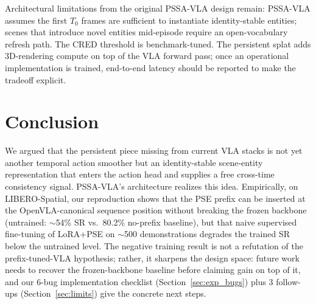 \documentclass[10pt,letterpaper]{article}
\newcommand{\method}{\textsc{PSSA-VLA}\xspace}
\begin{document}
\noindent
Architectural limitations from the original \method design remain:
\method assumes the first $T_0$ frames are sufficient to instantiate
identity-stable entities; scenes that introduce novel entities
mid-episode require an open-vocabulary refresh path. The CRED threshold
is benchmark-tuned. The persistent splat adds 3D-rendering compute on
top of the VLA forward pass; once an operational implementation is
trained, end-to-end latency should be reported to make the tradeoff
explicit.

\section{Conclusion}\label{sec:conclusion}

We argued that the persistent piece missing from current VLA stacks is
not yet another temporal action smoother but an identity-stable
scene-entity representation that enters the action head and supplies a
free cross-time consistency signal. \method's architecture realizes
this idea. Empirically, on LIBERO-Spatial, our reproduction shows that
the PSE prefix can be inserted at the OpenVLA-canonical sequence
position without breaking the frozen backbone (untrained: $\sim$54\%
SR vs.\ 80.2\% no-prefix baseline), but that naive supervised
fine-tuning of LoRA+PSE on $\sim$500 demonstrations degrades the
trained SR below the untrained level. The negative training result
is not a refutation of the prefix-tuned-VLA hypothesis; rather, it
sharpens the design space: future work needs to recover the
frozen-backbone baseline before claiming gain on top of it, and our
6-bug implementation checklist (Section~\ref{sec:exp_bugs}) plus
3 follow-ups (Section~\ref{sec:limits}) give the concrete next steps.



\end{document}
